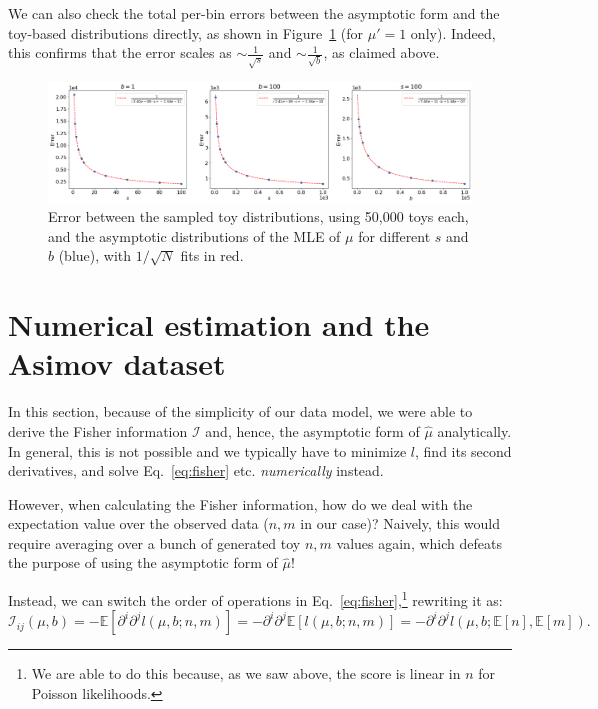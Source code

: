 We can also check the total per-bin errors between the asymptotic form and the toy-based distributions directly, as shown in Figure~\ref{fig:mle_errors} (for $\mu' = 1$ only).
Indeed, this confirms that the error scales as $\sim \frac{1}{\sqrt{s}}$ and $\sim \frac{1}{\sqrt{b}}$, as claimed above.

\begin{figure}[htb]
\centering
\includegraphics[width=\textwidth]{figures/05-asymptotic-mle/5.png}
\caption{Error between the sampled toy distributions, using 50,000 toys each, and the asymptotic distributions of the MLE of $\mu$ for different $s$ and $b$ (blue), with $1/\sqrt{N}$ fits in red.}
\label{fig:mle_errors}
\end{figure}


\section{Numerical estimation and the Asimov dataset}
\label{sec:pmle_asimov}

In this section, because of the simplicity of our data model, we were able to derive the Fisher information $\mathcal I$ and, hence, the asymptotic form of $\hat \mu$ analytically.
In general, this is not possible and we typically have to minimize $l$, find its second derivatives, and solve Eq.~\ref{eq:fisher} etc. \textit{numerically} instead.

However, when calculating the Fisher information, how do we deal with the expectation value over the observed data ($n, m$ in our case)? Naively, this would require averaging over a bunch of generated toy $n, m$ values again, which defeats the purpose of using the asymptotic form of $\hat \mu$!

Instead, we can switch the order of operations in Eq.~\ref{eq:fisher},\footnote{We are able to do this because, as we saw above, the score is linear in $n$ for Poisson likelihoods.} rewriting it as:
\begin{equation}
  \mathcal I_{ij}(\mu, b) = - \mathbb E[\partial^i\partial^j l(\mu, b; n, m)] = - \partial^i\partial^j \mathbb E[l(\mu, b; n, m)] = -\partial^i\partial^j l(\mu, b; \mathbb E[n], \mathbb E[m]).
\label{eq:fisher_asimov}
\end{equation}

